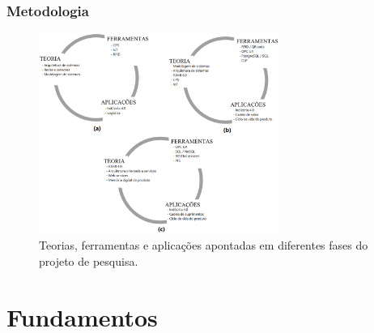 \documentclass[10pt]{beamer}
\begin{document}
\begin{frame}
	\frametitle{Metodologia}
	
	\begin{figure}[htb]
		\centering
		\caption{Teorias, ferramentas e aplicações apontadas em diferentes fases do projeto de pesquisa.}
		\label{fig:metodologia-jensen-projeto}
		\includegraphics[width=0.7\textwidth]{metodologia-jensen-projeto.png}
	\end{figure}
	
\end{frame}

\iffalse
\section{Fundamentos}
\end{document}
